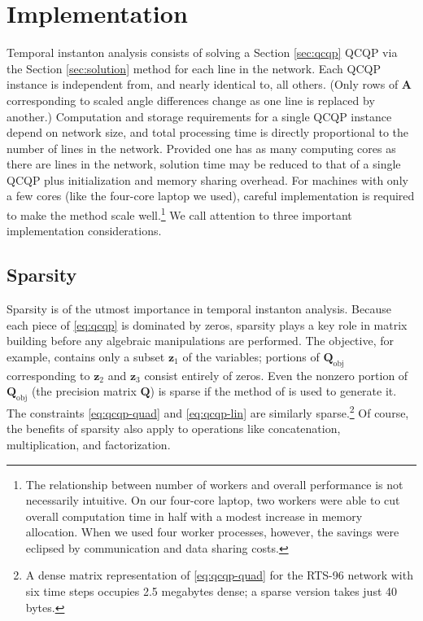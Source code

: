 \documentclass[journal,twoside]{IEEEtran}
\renewcommand{\vec}[1]{\mathbf{#1}}
\begin{document}
\section{Implementation}\label{sec:implementation}
Temporal instanton analysis consists of solving a Section \ref{sec:qcqp} QCQP via the Section \ref{sec:solution} method for each line in the network. Each QCQP instance is independent from, and nearly identical to, all others. (Only rows of $\mathbf{A}$ corresponding to scaled angle differences change as one line is replaced by another.) Computation and storage requirements for a single QCQP instance depend on network size, and total processing time is directly proportional to the number of lines in the network. Provided one has as many computing cores as there are lines in the network, solution time may be reduced to that of a single QCQP plus initialization and memory sharing overhead. For machines with only a few cores (like the four-core laptop we used), careful implementation is required to make the method scale well.\footnote{The relationship between number of workers and overall performance is not necessarily intuitive. On our four-core laptop, two workers were able to cut overall computation time in half with a modest increase in memory allocation. When we used four worker processes, however, the savings were eclipsed by communication and data sharing costs.} We call attention to three important implementation considerations.

\subsection{Sparsity}\label{sec:implementation-sparsity}
Sparsity is of the utmost importance in temporal instanton analysis. Because each piece of \eqref{eq:qcqp} is dominated by zeros, sparsity plays a key role in matrix building before any algebraic manipulations are performed. The objective, for example, contains only a subset $\vec{z}_1$ of the variables; portions of $\mathbf{Q}_\text{obj}$ corresponding to $\vec{z}_2$ and $\vec{z}_3$ consist entirely of zeros. Even the nonzero portion of $\mathbf{Q}_\text{obj}$ (the precision matrix $\mathbf{Q}$) is sparse if the method of \cite{tastu2015} is used to generate it. The constraints \eqref{eq:qcqp-quad} and \eqref{eq:qcqp-lin} are similarly sparse.\footnote{A dense matrix representation of \eqref{eq:qcqp-quad} for the RTS-96 network with six time steps occupies 2.5 megabytes dense; a sparse version takes just 40 bytes.} Of course, the benefits of sparsity also apply to operations like concatenation, multiplication, and factorization.
\end{document}
